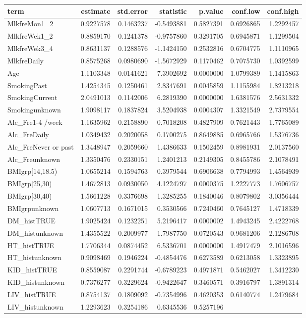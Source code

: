 \documentclass[]{article}
\begin{document}
\begin{longtable}[]{@{}lrrrrrr@{}}
\toprule
term & estimate & std.error & statistic & p.value & conf.low &
conf.high\tabularnewline
\midrule
\endhead
MlkfreMon1\_2 & 0.9227578 & 0.1463237 & -0.5493881 & 0.5827391 &
0.6926865 & 1.2292457\tabularnewline
MlkfreWek1\_2 & 0.8859170 & 0.1241378 & -0.9757860 & 0.3291705 &
0.6945871 & 1.1299504\tabularnewline
MlkfreWek3\_4 & 0.8631137 & 0.1288576 & -1.1424150 & 0.2532816 &
0.6704775 & 1.1110965\tabularnewline
MlkfreDaily & 0.8575268 & 0.0980690 & -1.5672929 & 0.1170462 & 0.7075730
& 1.0392599\tabularnewline
Age & 1.1103348 & 0.0141621 & 7.3902692 & 0.0000000 & 1.0799389 &
1.1415863\tabularnewline
SmokingPast & 1.4254345 & 0.1250461 & 2.8347691 & 0.0045859 & 1.1155984
& 1.8213218\tabularnewline
SmokingCurrent & 2.0491013 & 0.1142006 & 6.2819390 & 0.0000000 &
1.6381576 & 2.5631332\tabularnewline
Smokingunknown & 1.9098117 & 0.1837824 & 3.5204938 & 0.0004307 &
1.3321549 & 2.7379554\tabularnewline
Alc\_Fre1-4 /week & 1.1635962 & 0.2158890 & 0.7018208 & 0.4827909 &
0.7621443 & 1.7765089\tabularnewline
Alc\_FreDaily & 1.0349432 & 0.2020058 & 0.1700275 & 0.8649885 &
0.6965766 & 1.5376736\tabularnewline
Alc\_FreNever or past & 1.3448947 & 0.2059660 & 1.4386633 & 0.1502459 &
0.8981931 & 2.0137560\tabularnewline
Alc\_Freunknown & 1.3350476 & 0.2330151 & 1.2401213 & 0.2149305 &
0.8455786 & 2.1078491\tabularnewline
BMIgrp{[}14,18.5) & 1.0655214 & 0.1594763 & 0.3979544 & 0.6906638 &
0.7794993 & 1.4564939\tabularnewline
BMIgrp{[}25,30) & 1.4672813 & 0.0930050 & 4.1224797 & 0.0000375 &
1.2227773 & 1.7606757\tabularnewline
BMIgrp{[}30,40) & 1.5661228 & 0.3376698 & 1.3285255 & 0.1840046 &
0.8079802 & 3.0356444\tabularnewline
BMIgrpunknown & 1.0607713 & 0.1671015 & 0.3530566 & 0.7240460 &
0.7645127 & 1.4718339\tabularnewline
DM\_histTRUE & 1.9025424 & 0.1232251 & 5.2196417 & 0.0000002 & 1.4943245
& 2.4222768\tabularnewline
DM\_histunknown & 1.4355522 & 0.2009977 & 1.7987750 & 0.0720543 &
0.9681206 & 2.1286708\tabularnewline
HT\_histTRUE & 1.7706344 & 0.0874452 & 6.5336701 & 0.0000000 & 1.4917479
& 2.1016596\tabularnewline
HT\_histunknown & 0.9098469 & 0.1946224 & -0.4854476 & 0.6273589 &
0.6213058 & 1.3323895\tabularnewline
KID\_histTRUE & 0.8559087 & 0.2291744 & -0.6789223 & 0.4971871 &
0.5462027 & 1.3412230\tabularnewline
KID\_histunknown & 0.7376277 & 0.3229624 & -0.9422647 & 0.3460571 &
0.3916797 & 1.3891314\tabularnewline
LIV\_histTRUE & 0.8754137 & 0.1809092 & -0.7354996 & 0.4620353 &
0.6140774 & 1.2479684\tabularnewline
LIV\_histunknown & 1.2293623 & 0.3254186 & 0.6345536 & 0.5257196 &

\end{longtable}
\end{document}
